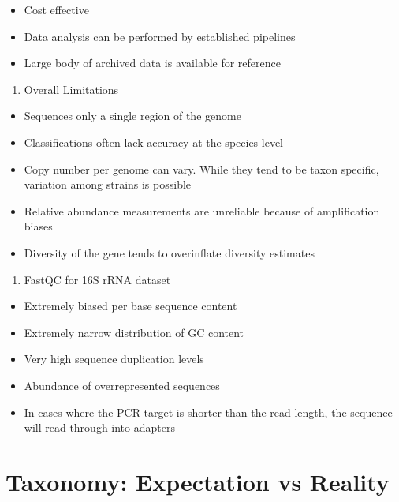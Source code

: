 \documentclass[
]{book}
\providecommand{\tightlist}{%
  \setlength{\itemsep}{0pt}\setlength{\parskip}{0pt}}
\begin{document}
\begin{itemize}
\tightlist
\item
  Cost effective
\item
  Data analysis can be performed by established pipelines
\item
  Large body of archived data is available for reference
\end{itemize}

\begin{enumerate}
\def\labelenumi{\arabic{enumi}.}
\setcounter{enumi}{1}
\tightlist
\item
  Overall Limitations
\end{enumerate}

\begin{itemize}
\tightlist
\item
  Sequences only a single region of the genome
\item
  Classifications often lack accuracy at the
  species level
\item
  Copy number per genome can vary. While they
  tend to be taxon specific, variation among
  strains is possible
\item
  Relative abundance measurements are
  unreliable because of amplification biases
\item
  Diversity of the gene tends to overinflate
  diversity estimates
\end{itemize}

\begin{enumerate}
\def\labelenumi{\arabic{enumi}.}
\setcounter{enumi}{2}
\tightlist
\item
  FastQC for 16S rRNA dataset
\end{enumerate}

\begin{itemize}
\tightlist
\item
  Extremely biased per base sequence content
\item
  Extremely narrow distribution of GC content
\item
  Very high sequence duplication levels
\item
  Abundance of overrepresented sequences
\item
  In cases where the PCR target is shorter than the read length, the sequence will read through into adapters
\end{itemize}

\hypertarget{taxonomy-expectation-vs-reality}{%
\section{Taxonomy: Expectation vs Reality}\label{taxonomy-expectation-vs-reality}}
\end{document}
